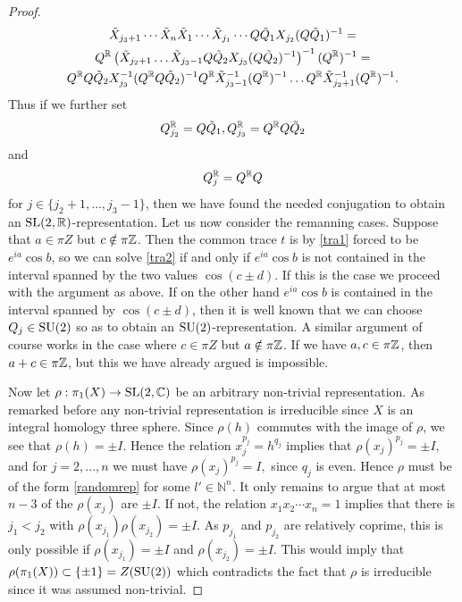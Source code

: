 \begin{proof}
\begin{multline}\tilde X_{{j_3}+1}\cdots \tilde X_n  \tilde X_1\cdots \tilde X_{j_1} \cdots Q \tilde Q_1X_{j_2}(Q \tilde Q_1)^{-1} = \\Q^{\mathbb{R}} \left(\tilde X_{j_2+1} \ldots \tilde X_{j_3-1} Q \tilde Q_2 X_{j_3}(Q \tilde Q_2)^{-1}\right)^{-1} (Q^{\mathbb{R}})^{-1} =
\\  Q^{\mathbb{R}} Q \tilde Q_2 X_{j_3}^{-1}  (Q^{\mathbb{R}} Q \tilde Q_2)^{-1} Q^{\mathbb{R}}  \tilde X_{j_3-1}^{-1} (Q^{\mathbb{R}})^{-1} \ldots Q^{\mathbb{R}}  \tilde X_{j_2+1}^{-1} (Q^{\mathbb{R}})^{-1}  .
\end{multline}
Thus if we further set 
$$ Q^{\mathbb{R}}_{j_2} = Q \tilde Q_1, Q^{\mathbb{R}}_{j_3} = Q^{\mathbb{R}} Q \tilde Q_2$$
and
$$ Q^{\mathbb{R}}_j = Q^{\mathbb{R}} Q$$
for $j\in \{j_2+1,\ldots,j_3-1\}$, then
we have found the needed conjugation to obtain an $\operatorname{SL}(2,\mathbb{R})$-representation. Let us now consider the remanning cases.
Suppose that $a\in \pi Z$ but $c\notin \pi \mathbb{Z}$. Then the common trace $t$ is by \eqref{tra1} forced to be $e^{ia} \cos b$, so we can solve \eqref{tra2} if and only if $e^{ia} \cos b$ is not contained in the interval spanned by the two values $\cos(c\pm d)$. If this is the case we proceed with the argument as above. If on the other hand $e^{ia} \cos b$ is contained in the interval spanned by $\cos(c\pm d)$, then it is well known that we can choose $Q_j \in \operatorname{SU}(2)$ so as to obtain an $\operatorname{SU}(2)$-representation. A similar argument of course works in the case where $c\in \pi Z$ but $a\notin \pi \mathbb{Z}$. If we have $a,c \in \pi\mathbb{Z}$, then $a+c \in \pi\mathbb{Z}$, but this we have already argued is impossible.



 Now let $\rho: \pi_1(X) \rightarrow \operatorname{SL}(2,\mathbb{C})$ be an arbitrary non-trivial representation. As remarked before any non-trivial representation is irreducible since $X$ is an integral homology three sphere. Since $\rho(h)$ commutes with the image of $\rho$, we see that $\rho(h) = \pm I$. Hence the relation $x_j^{p_j}=h^{q_j}$ implies that $\rho(x_j)^{p_j}=\pm I,$ and for $j=2,...,n$ we must have $\rho(x_j)^{p_j}=I,$ since $q_j$ is even. Hence $\rho$ must be of the form \eqref{randomrep} for some $l'\in \mathbb{N}^n.$ It only remains to argue that at most $n-3$ of the $\rho(x_j)$ are $\pm I.$ If not, the relation $x_1x_2 \cdots x_n=1$ implies that there is $j_1<j_2$ with 
 $\rho(x_{j_1})\rho(x_{j_2})=\pm I.$ As $p_{j_1}$ and $p_{j_2}$ are relatively coprime, this is only possible if $\rho(x_{j_1})=\pm I$ and $\rho(x_{j_2})=\pm I.$ This would imply that $\rho(\pi_1(X))\subset \{\pm 1\}=Z(\operatorname{SU}(2))$ which contradicts the fact that $\rho$ is irreducible since it was assumed non-trivial. 
 

\end{proof}

